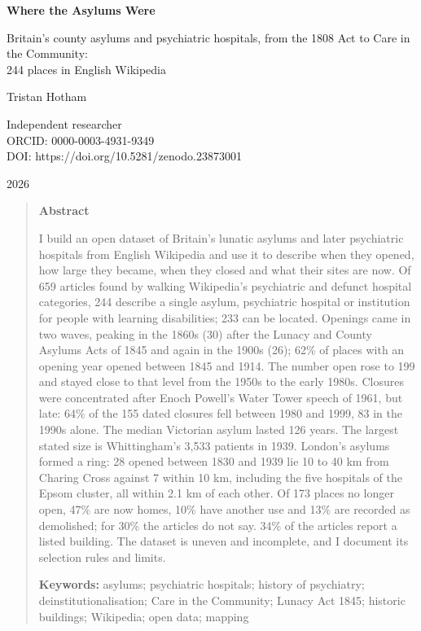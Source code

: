\documentclass[11pt,a4paper]{article}
\begin{document}
\begin{center}
{\Large\bfseries Where the Asylums Were\par}
\vspace{0.4em}
{\large Britain's county asylums and psychiatric hospitals, from the 1808 Act to Care in the Community:\\244 places in English Wikipedia\par}
\vspace{1.2em}
{\large Tristan Hotham\par}
\vspace{0.3em}
{\small Independent researcher\\
ORCID: 0000-0003-4931-9349\\
DOI: https://doi.org/10.5281/zenodo.23873001\par}
\vspace{0.8em}
2026
\end{center}

\begin{quote}
\small
\begin{center}\textbf{Abstract}\end{center}
I build an open dataset of Britain's lunatic asylums and later psychiatric hospitals from English Wikipedia and use it to describe when they opened, how large they became, when they closed and what their sites are now. Of 659 articles found by walking Wikipedia's psychiatric and defunct hospital categories, 244 describe a single asylum, psychiatric hospital or institution for people with learning disabilities; 233 can be located. Openings came in two waves, peaking in the 1860s (30) after the Lunacy and County Asylums Acts of 1845 and again in the 1900s (26); 62\% of places with an opening year opened between 1845 and 1914. The number open rose to 199 and stayed close to that level from the 1950s to the early 1980s. Closures were concentrated after Enoch Powell's Water Tower speech of 1961, but late: 64\% of the 155 dated closures fell between 1980 and 1999, 83 in the 1990s alone. The median Victorian asylum lasted 126 years. The largest stated size is Whittingham's 3,533 patients in 1939. London's asylums formed a ring: 28 opened between 1830 and 1939 lie 10 to 40 km from Charing Cross against 7 within 10 km, including the five hospitals of the Epsom cluster, all within 2.1 km of each other. Of 173 places no longer open, 47\% are now homes, 10\% have another use and 13\% are recorded as demolished; for 30\% the articles do not say. 34\% of the articles report a listed building. The dataset is uneven and incomplete, and I document its selection rules and limits.

\textbf{Keywords:} asylums; psychiatric hospitals; history of psychiatry; deinstitutionalisation; Care in the Community; Lunacy Act 1845; historic buildings; Wikipedia; open data; mapping
\end{quote}
\end{document}
